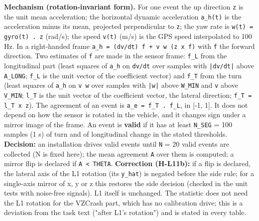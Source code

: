 \textbf{Mechanism (rotation-invariant form).} For one event the up direction \texttt{z} is the unit mean acceleration; the horizontal dynamic acceleration \texttt{a\_h(t)} is the acceleration minus its mean, projected perpendicular to \texttt{z}; the yaw rate is \texttt{w(t) = gyro(t) . z} (rad/s); the speed \texttt{v(t)} (m/s) is the GPS speed interpolated to 100 Hz. In a right-handed frame \texttt{a\_h = (dv/dt) f + v w (z x f)} with \texttt{f} the forward direction. Two estimates of \texttt{f} are made in the sensor frame: \texttt{f\_L} from the longitudinal part (least squares of \texttt{a\_h} on \texttt{dv/dt} over samples with \texttt{|dv/dt|} above \texttt{A\_LONG}; \texttt{f\_L} is the unit vector of the coefficient vector) and \texttt{f\_T} from the turn (least squares of \texttt{a\_h} on \texttt{v w} over samples with \texttt{|w|} above \texttt{W\_MIN} and \texttt{v} above \texttt{V\_MIN}; \texttt{l\_T} is the unit vector of the coefficient vector, the lateral direction; \texttt{f\_T = l\_T x z}). The agreement of an event is \texttt{a\_e = f\_T . f\_L}, in [-1, 1]. It does not depend on how the sensor is rotated in the vehicle, and it changes sign under a mirror image of the frame. An event is \textbf{valid} if it has at least \texttt{N\_SEG} = 100 samples (1 s) of turn and of longitudinal change in the stated thresholds. \textbf{Decision:} an installation drives valid events until \texttt{N} = 20 valid events are collected (N is fixed here); the mean agreement \texttt{A} over them is computed; a mirror flip is declared if \texttt{A < THETA}. \textbf{Correction (H-L11b):} if a flip is declared, the lateral axis of the L1 rotation (its \texttt{y\_hat}) is negated before the side rule; for a single-axis mirror of x, y or z this restores the side decision (checked in the unit tests with noise-free signals). L1 itself is unchanged. The statistic does not need the L1 rotation for the VZCrash part, which has no calibration drive; this is a deviation from the task text ("after L1's rotation") and is stated in every table.

